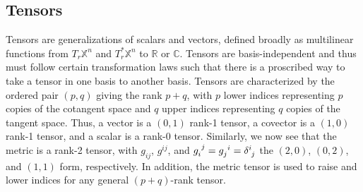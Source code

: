\begin{appendices}



\section{Tensors}
Tensors are generalizations of scalars and vectors, defined broadly as multilinear functions from $T_r\mathbb{X}^n$ and $T^*_r\mathbb{X}^n$ to $\mathbb{R}$ or $\mathbb{C}$.
Tensors are basis-independent and thus must follow certain transformation laws such that there is a proscribed way to take a tensor in one basis to another basis.
Tensors are characterized by the ordered pair $(p,q)$ giving the rank $p + q$, with $p$ lower indices representing $p$ copies of the cotangent space and $q$ upper indices representing $q$ copies of the tangent space.
Thus, a vector is a $(0,1)$ rank-1 tensor, a covector is a $(1,0)$ rank-1 tensor, and a scalar is a rank-0 tensor.
Similarly, we now see that the metric is a rank-2 tensor, with $g_{ij}$, $g^{ij}$, and $\tensor{g}{_i^j} = \tensor{g}{_j^i} = \tensor{\delta}{^i_j}$ the $(2,0)$, $(0,2)$, and $(1,1)$ form, respectively.
In addition, the metric tensor is used to raise and lower indices for any general $(p + q)$-rank tensor. \\


\end{appendices}
